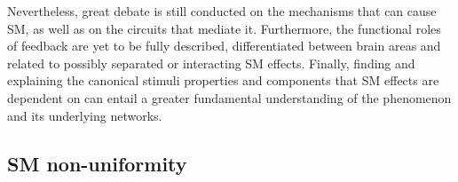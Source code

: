 Nevertheless, great debate is still conducted on the mechanisms that can cause SM, as well as on the circuits that mediate it. Furthermore, the functional roles of feedback are yet to be fully described, differentiated between brain areas and related to possibly separated or interacting SM effects. Finally, finding and explaining the canonical stimuli properties and components that SM effects are dependent on can entail a greater fundamental understanding of the phenomenon and its underlying networks. 

\subsection{SM non-uniformity}